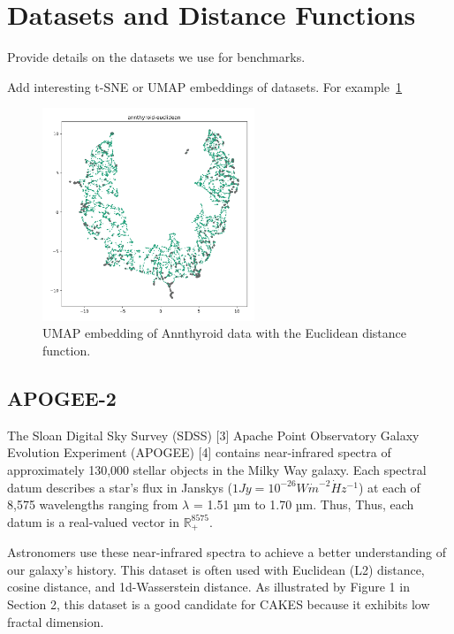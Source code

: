 
\section{Datasets and Distance Functions}
\label{sec:datasets-and-distance-functions}

Provide details on the datasets we use for benchmarks.

Add interesting t-SNE or UMAP embeddings of datasets.
For example~\ref{fig:discussion:umap-annthyroid-euclidean}

\begin{figure}[ht!]
    \centering
    \includegraphics[width=2.5in]{images/umaps/annthyroid-euclidean-umap2d.png}
    \caption{UMAP embedding of Annthyroid data with the Euclidean distance function.}
    \label{fig:discussion:umap-annthyroid-euclidean}
\end{figure}

\subsection{APOGEE-2}
\label{subsec:datasets:apogee-2}
The Sloan Digital Sky Survey (SDSS) [3] Apache Point Observatory Galaxy Evolution
Experiment (APOGEE) [4] contains near-infrared
spectra of approximately 130,000 stellar objects in the Milky
Way galaxy. Each spectral datum describes a star's flux in
Janskys ($1 Jy = 10^{-26} W \dot m^{-2} \dot Hz^{-1}$) at each of 8,575 wavelengths ranging from $\lambda$ = 1.51 µm to 1.70 µm. Thus,
Thus, each datum is a real-valued vector in $\mathbb{R}_{+}^{8575}$. 

Astronomers use these near-infrared spectra to achieve a better understanding of our galaxy's history. This dataset 
is often used with Euclidean (L2) distance, cosine distance, and 1d-Wasserstein distance. As illustrated by Figure 1 in Section 2,
this dataset is a good candidate for CAKES because it exhibits low fractal dimension. 

